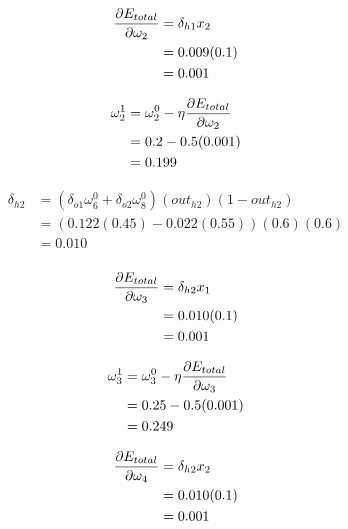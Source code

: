 \documentclass[10pt,a4paper]{article}
\begin{document}
\begin{equation}
\begin{split}
\pdv{E_{total}}{\omega_2} &= \delta_{h1}x_2\\ 
                          &= 0.009(0.1)\\
                          &= 0.001\\
\end{split}
\end{equation}

\begin{equation}
\begin{split}
\omega_2^1 &= \omega_2^0 - \eta\pdv{E_{total}}{\omega_2}\\
           &= 0.2 -0.5(0.001)\\
           &= 0.199\\
\end{split}
\end{equation}

\begin{equation}
\begin{split}
\delta_{h2} &= (\delta_{o1}\omega_6^0 + \delta_{o2}\omega_8^0)(out_{h2})(1-out_{h2})\\
&= (0.122(0.45) -0.022(0.55))(0.6)(0.6)\\
&= 0.010\\
\end{split}
\end{equation}

\begin{equation}
\begin{split}
\pdv{E_{total}}{\omega_3} &= \delta_{h2}x_1\\ 
                          &= 0.010(0.1)\\
                          &= 0.001\\
\end{split}
\end{equation}

\begin{equation}
\begin{split}
\omega_3^1 &= \omega_3^0 - \eta\pdv{E_{total}}{\omega_3}\\
           &= 0.25 -0.5(0.001)\\
           &= 0.249\\
\end{split}
\end{equation}

\begin{equation}
\begin{split}
\pdv{E_{total}}{\omega_4} &= \delta_{h2}x_2\\ 
                          &= 0.010(0.1)\\
                          &= 0.001\\
\end{split}
\end{equation}
\end{document}
